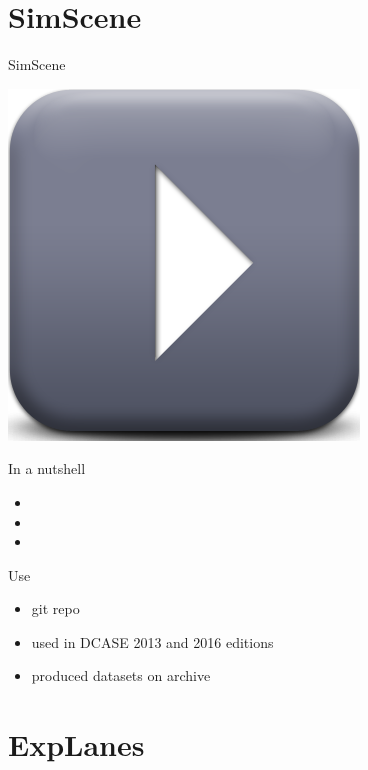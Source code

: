 \documentclass[compress]{beamer}
\begin{document}
\section{SimScene}

\begin{frame}{SimScene}
\begin{center}
\includegraphics[width=.6\columnwidth]{figures/play} \\
\end{center}
\end{frame}

\begin{frame}{In a nutshell}
\begin{itemize}
\item
\item
\item
\end{itemize}
\end{frame}


\begin{frame}{Use}
\begin{itemize}
\item git repo
\item used in DCASE 2013 and 2016 editions
\item produced datasets on archive
\end{itemize}
\end{frame}

\section{ExpLanes}
\end{document}
